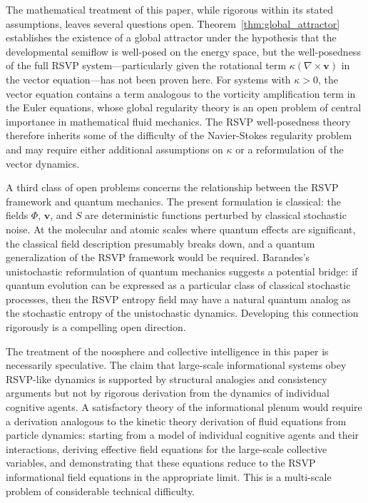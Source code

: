 \documentclass[12pt]{article}
\begin{document}
The mathematical treatment of this paper, while rigorous within its stated assumptions, leaves several questions open. Theorem~\ref{thm:global_attractor} establishes the existence of a global attractor under the hypothesis that the developmental semiflow is well-posed on the energy space, but the well-posedness of the full RSVP system---particularly given the rotational term $\kappa(\nabla \times \mathbf{v})$ in the vector equation---has not been proven here. For systems with $\kappa > 0$, the vector equation contains a term analogous to the vorticity amplification term in the Euler equations, whose global regularity theory is an open problem of central importance in mathematical fluid mechanics. The RSVP well-posedness theory therefore inherits some of the difficulty of the Navier-Stokes regularity problem and may require either additional assumptions on $\kappa$ or a reformulation of the vector dynamics.

A third class of open problems concerns the relationship between the RSVP framework and quantum mechanics. The present formulation is classical: the fields $\Phi$, $\mathbf{v}$, and $S$ are deterministic functions perturbed by classical stochastic noise. At the molecular and atomic scales where quantum effects are significant, the classical field description presumably breaks down, and a quantum generalization of the RSVP framework would be required. Barandes's unistochastic reformulation of quantum mechanics \cite{barandes2023} suggests a potential bridge: if quantum evolution can be expressed as a particular class of classical stochastic processes, then the RSVP entropy field may have a natural quantum analog as the stochastic entropy of the unistochastic dynamics. Developing this connection rigorously is a compelling open direction.

The treatment of the noosphere and collective intelligence in this paper is necessarily speculative. The claim that large-scale informational systems obey RSVP-like dynamics is supported by structural analogies and consistency arguments but not by rigorous derivation from the dynamics of individual cognitive agents. A satisfactory theory of the informational plenum would require a derivation analogous to the kinetic theory derivation of fluid equations from particle dynamics: starting from a model of individual cognitive agents and their interactions, deriving effective field equations for the large-scale collective variables, and demonstrating that these equations reduce to the RSVP informational field equations in the appropriate limit. This is a multi-scale problem of considerable technical difficulty.
\end{document}

